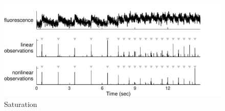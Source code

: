 

% 
% 

\begin{figure}[h!]
\centering \includegraphics[width=.9\linewidth]{../figs/nonlin}
\caption{Saturation} \label{fig:satur}
\end{figure}
